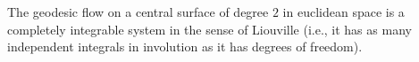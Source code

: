 The geodesic flow on a central surface of degree $2$ in euclidean space is a completely integrable system in the sense of Liouville (i.e., it has as many independent integrals in involution as it has degrees of freedom).
